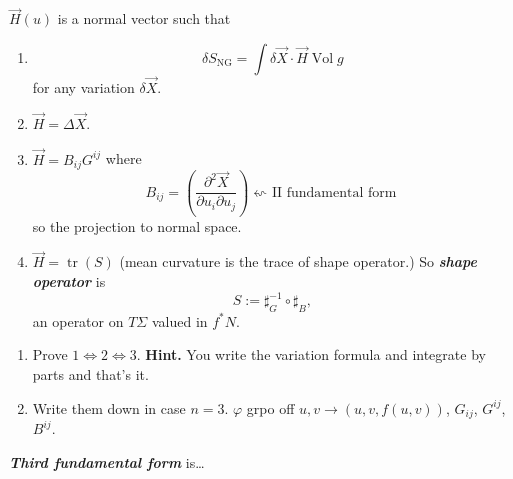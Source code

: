 \(\vec{H}(u)\) is a normal vector such that
\begin{enumerate}
\item \[\delta S_{\operatorname{ NG}}=\int \delta \vec{X}\cdot \vec{H}\operatorname{Vol}g\]
for any variation \(\delta \vec{X}\).
\item \(\vec{H}=\Delta \vec{X}\).
\item \(\vec{H} =B_{ij}G^{ij}\)
	where
	\[B_{ij}=\left(\frac{\partial^2 \vec{X}}{\partial u_i\partial u_j}\right) \text{\(\leftsquigarrow \) II fundamental form} \]
	so the projection to normal space.
\item \(\vec{H}=\operatorname{tr}(S)\) (mean curvature is the trace of shape operator.) So \textit{\textbf{shape operator}} is
	 \[S:=\sharp^{-1}_G \circ \sharp_B,\]
	an operator on  \(T \Sigma\) valued in \(f^*N\).
\end{enumerate}

\begin{exercise}\leavevmode
\begin{enumerate}
\item Prove \(1 \iff 2 \iff 3\). \textbf{Hint.}  You write the variation formula and integrate by parts and that's it.
\item Write them down in case \(n=3\). \(\varphi\) grpo off \(u,v \to (u,v,f(u,v))\), \(G_{ij}\), \(G^{ij}\), \(B^{ij}\).
\end{enumerate}\end{exercise}

\begin{defn}\leavevmode
\textit{\textbf{Third fundamental form}} is…
\end{defn}
\clearpage

